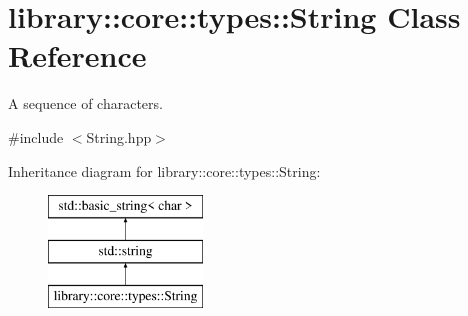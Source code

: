 \hypertarget{classlibrary_1_1core_1_1types_1_1_string}{}\section{library\+:\+:core\+:\+:types\+:\+:String Class Reference}
\label{classlibrary_1_1core_1_1types_1_1_string}


A sequence of characters.  




{\ttfamily \#include $<$String.\+hpp$>$}

Inheritance diagram for library\+:\+:core\+:\+:types\+:\+:String\+:\begin{figure}[H]
\begin{center}
\leavevmode
\includegraphics[height=3.000000cm]{classlibrary_1_1core_1_1types_1_1_string}
\end{center}
\end{figure}
